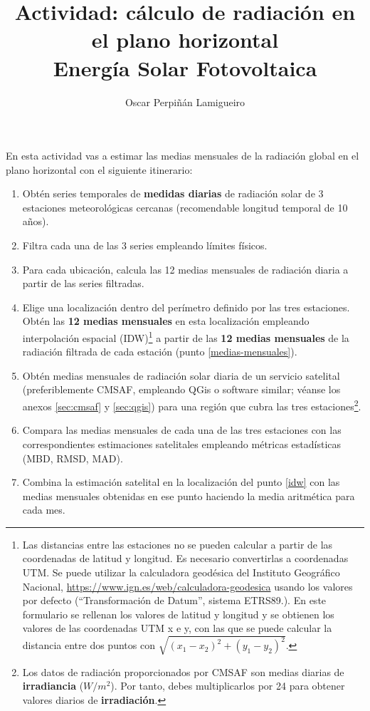 \documentclass[11pt]{article}
\author{Oscar Perpiñán Lamigueiro}
\date{}
\title{Actividad: cálculo de radiación en el plano horizontal\\\medskip
\large Energía Solar Fotovoltaica}
\begin{document}
\maketitle

En esta actividad vas a estimar las medias mensuales de la radiación
global en el plano horizontal con el siguiente itinerario:

\begin{enumerate}
\item Obtén series temporales de \textbf{medidas diarias} de radiación
  solar de 3 estaciones meteorológicas cercanas (recomendable longitud
  temporal de 10 años).
\item Filtra cada una de las 3 series empleando límites físicos. \label{filtrado}
\item Para cada ubicación, calcula las 12 medias mensuales de
  radiación diaria a partir de las series filtradas. \label{medias-mensuales}
\item Elige una localización dentro del perímetro definido por las
  tres estaciones. Obtén las \textbf{12 medias mensuales} en esta
  localización empleando interpolación espacial (IDW)\footnote{Las
    distancias entre las estaciones no se pueden calcular a partir de
    las coordenadas de latitud y longitud. Es necesario convertirlas a
    coordenadas UTM. Se puede utilizar la calculadora geodésica del
    Instituto Geográfico Nacional,
    \url{https://www.ign.es/web/calculadora-geodesica} usando los
    valores por defecto (``Transformación de Datum'', sistema
    ETRS89.). En este formulario se rellenan los valores de latitud y
    longitud y se obtienen los valores de las coordenadas UTM x e y,
    con las que se puede calcular la distancia entre dos puntos con
    $\sqrt{(x_1 - x_2)^2 + (y_1 - y_2)^2}$.} a partir de las
  \textbf{12 medias mensuales} de la radiación filtrada de cada
  estación (punto \ref{medias-mensuales}). \label{idw}
\item Obtén medias mensuales de radiación solar diaria de un servicio
  satelital (preferiblemente CMSAF, empleando QGis o software similar;
  véanse los anexos \ref{sec:cmsaf} y \ref{sec:qgis}) para una región que
  cubra las tres estaciones\footnote{Los datos de radiación
    proporcionados por CMSAF son medias diarias de
    \textbf{irradiancia} (\(W/m^2\)). Por tanto, debes multiplicarlos
    por 24 para obtener valores diarios de
    \textbf{irradiación}.}.\label{satelite}
\item Compara las medias mensuales de cada una de las tres estaciones
  con las correspondientes estimaciones satelitales empleando métricas
  estadísticas (MBD, RMSD, MAD).
\item Combina la estimación satelital en la localización del punto
  \ref{idw} con las medias mensuales obtenidas en ese punto haciendo
  la media aritmética para cada mes.
\end{enumerate}
\end{document}

